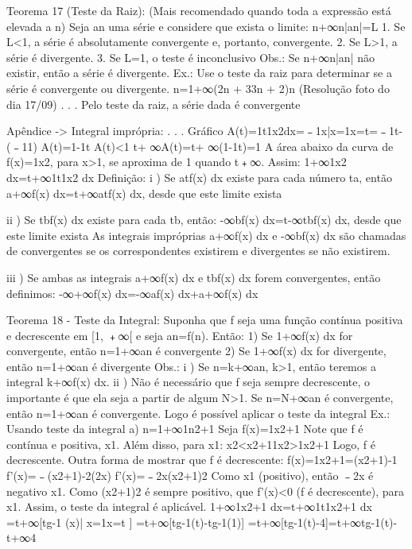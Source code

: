 Teorema 17 (Teste da Raiz):                  (Mais recomendado quando toda a expressão está elevada a n)
    Seja an uma série e considere que exista o limite:
        n+∞n|an|=L
    1. Se L<1, a série é absolutamente convergente e, portanto, convergente.
    2. Se L>1, a série é divergente.
    3. Se L=1, o teste é inconclusivo
    Obs.: Se n+∞n|an| não existir, então a série é divergente.
    Ex.: Use o teste da raiz para determinar se a série é convergente ou divergente.
            n=1+∞(2n + 33n + 2)n
            (Resolução foto do dia 17/09)
            . . . Pelo teste da raiz, a série dada é convergente


Apêndice -> Integral imprópria:
    . . . Gráfico
    A(t)=1t1x2dx=﹣1x|x=1x=t=﹣1t-(﹣11)
    A(t)=1-1t      A(t)<1
    t+ ∞A(t)=t+ ∞(1-1t)=1
   A área abaixo da curva de f(x)=1x2, para x>1, se aproxima de 1 quando t﹢∞. Assim:
        1+∞1x2 dx=t+∞1t1x2 dx
    Definição:
        i ) Se atf(x) dx existe para cada número ta, então
                a+∞f(x) dx=t+∞atf(x) dx, desde que este limite exista

        ii ) Se tbf(x) dx existe para cada tb, então:
                -∞bf(x) dx=t-∞tbf(x) dx, desde que este limite exista
        As integrais impróprias a+∞f(x) dx e -∞bf(x) dx são chamadas de convergentes se os correspondentes existirem e divergentes se não existirem.


        iii ) Se ambas as integrais a+∞f(x) dx e tbf(x) dx forem convergentes, então definimos:
                -∞+∞f(x) dx=-∞af(x) dx+a+∞f(x) dx

Teorema 18 - Teste da Integral: 
    Suponha que f seja uma função contínua positiva e decrescente em [1, ﹢∞[ e seja an=f(n). Então:
    1) Se 1+∞f(x) dx for convergente, então n=1+∞an é convergente
    2) Se 1+∞f(x) dx for divergente, então n=1+∞an é divergente
    Obs.:
        i ) Se n=k+∞an, k>1, então teremos a integral k+∞f(x) dx.
        ii ) Não é necessário que f seja sempre decrescente, o importante é que ela seja a partir de algum N>1. Se n=N+∞an é convergente, então n=1+∞an é convergente. Logo é possível aplicar o teste da integral
    Ex.: Usando teste da integral
        a) n=1+∞1n2+1
            Seja f(x)=1x2+1
            Note que f é contínua e positiva, x1. Além disso, para x1: 
                x2<x2+11x2>1x2+1
            Logo, f é decrescente.
            Outra forma de mostrar que f é decrescente:
                f(x)=1x2+1=(x2+1)-1
                f'(x)=﹣(x2+1)-2(2x)
                f'(x)=﹣2x(x2+1)2
            Como x1 (positivo), então ﹣2x é negativo x1. Como (x2+1)2 é sempre positivo, que 
            f'(x)<0 (f é decrescente), para x1. Assim, o teste da integral é aplicável.
                1+∞1x2+1 dx=t+∞1t1x2+1 dx
                                 =t+∞[tg-1 (x)| x=1x=t ]
                                 =t+∞[tg-1(t)-tg-1(1)]
                                 =t+∞[tg-1(t)-4]=t+∞tg-1(t)-t+∞4

